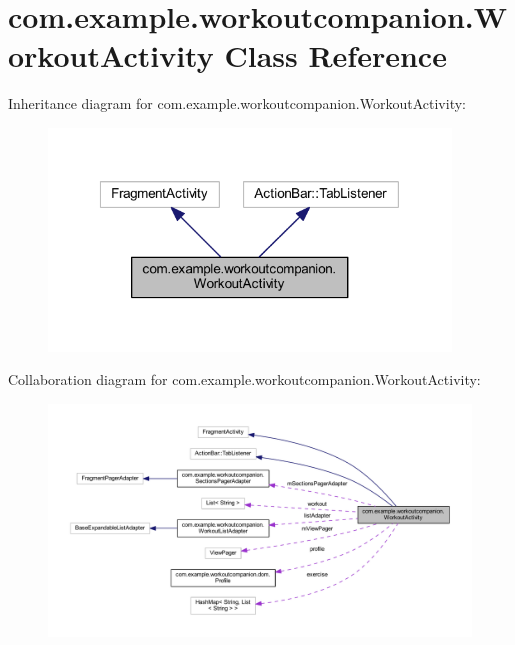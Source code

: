 \hypertarget{classcom_1_1example_1_1workoutcompanion_1_1_workout_activity}{\section{com.\-example.\-workoutcompanion.\-Workout\-Activity Class Reference}
\label{classcom_1_1example_1_1workoutcompanion_1_1_workout_activity}
}


Inheritance diagram for com.\-example.\-workoutcompanion.\-Workout\-Activity\-:\nopagebreak
\begin{figure}[H]
\begin{center}
\leavevmode
\includegraphics[width=303pt]{classcom_1_1example_1_1workoutcompanion_1_1_workout_activity__inherit__graph}
\end{center}
\end{figure}


Collaboration diagram for com.\-example.\-workoutcompanion.\-Workout\-Activity\-:
\nopagebreak
\begin{figure}[H]
\begin{center}
\leavevmode
\includegraphics[width=350pt]{classcom_1_1example_1_1workoutcompanion_1_1_workout_activity__coll__graph}
\end{center}
\end{figure}
